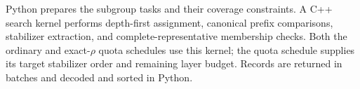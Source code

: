 Python prepares the subgroup tasks and their coverage constraints. A C++ search kernel performs depth-first assignment, canonical prefix comparisons, stabilizer extraction, and complete-representative membership checks. Both the ordinary and exact-$\rho$ quota schedules use this kernel; the quota schedule supplies its target stabilizer order and remaining layer budget. Records are returned in batches and decoded and sorted in Python.
